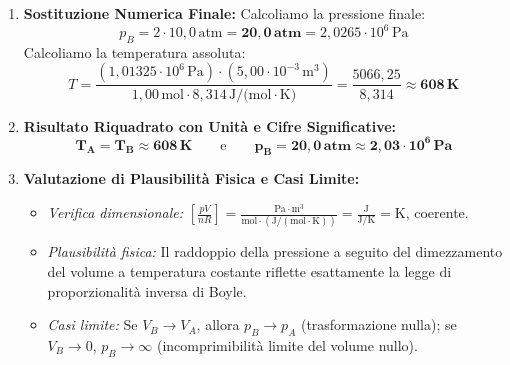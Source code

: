 \documentclass[11pt,a4paper,oneside]{report}
\begin{document}
\begin{problema}
\begin{enumerate}[label=\textbf{Fase \arabic*:}, leftmargin=*, itemsep=5pt]
  \item \textbf{Sostituzione Numerica Finale:}
  Calcoliamo la pressione finale:
  \[
  p_B = 2 \cdot 10{,}0\,\text{atm} = \mathbf{20{,}0\,\text{atm}} = 2{,}0265 \cdot 10^6\,\text{Pa}
  \]
  Calcoliamo la temperatura assoluta:
  \[
  T = \frac{(1{,}01325 \cdot 10^6\,\text{Pa}) \cdot (5{,}00 \cdot 10^{-3}\,\text{m}^3)}{1{,}00\,\text{mol} \cdot 8{,}314\,\text{J/(mol}\cdot\text{K)}} = \frac{5066{,}25}{8{,}314} \approx \mathbf{608\,\text{K}}
  \]

  \item \textbf{Risultato Riquadrato con Unit\`a e Cifre Significative:}
  \[
  \mathbf{\boxed{T_A = T_B \approx 608\,\text{K}}} \qquad \text{e} \qquad \mathbf{\boxed{p_B = 20{,}0\,\text{atm} \approx 2{,}03 \cdot 10^6\,\text{Pa}}}
  \]

  \item \textbf{Valutazione di Plausibilit\`a Fisica e Casi Limite:}
  \begin{itemize}[leftmargin=*, label=\textbullet]
    \item \textit{Verifica dimensionale:} $\left[\frac{p V}{n R}\right] = \frac{\text{Pa}\cdot\text{m}^3}{\text{mol}\cdot(\text{J}/(\text{mol}\cdot\text{K}))} = \frac{\text{J}}{\text{J/K}} = \text{K}$, coerente.
    \item \textit{Plausibilit\`a fisica:} Il raddoppio della pressione a seguito del dimezzamento del volume a temperatura costante riflette esattamente la legge di proporzionalit\`a inversa di Boyle.
    \item \textit{Casi limite:} Se $V_B \to V_A$, allora $p_B \to p_A$ (trasformazione nulla); se $V_B \to 0$, $p_B \to \infty$ (incomprimibilit\`a limite del volume nullo).
  \end{itemize}
\end{enumerate}
\end{problema}
\end{document}
